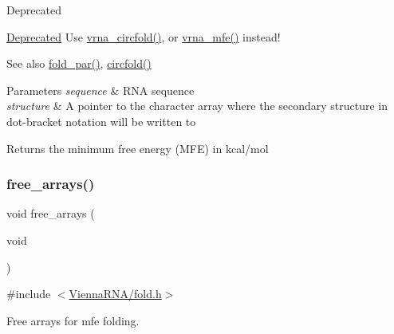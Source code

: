 \begin{DoxyRefDesc}{Deprecated}
\item[\hyperlink{deprecated__deprecated000072}{Deprecated}]Use \hyperlink{group__mfe__fold__single_gaf973483d8acbc8cc9aacfc8a9b7f0074}{vrna\+\_\+circfold()}, or \hyperlink{group__mfe__fold_gabd3b147371ccf25c577f88bbbaf159fd}{vrna\+\_\+mfe()} instead!\end{DoxyRefDesc}


\begin{DoxySeeAlso}{See also}
\hyperlink{group__mfe__fold__single_ga2bc41df5d71fee6fd8da9904ee65d8fb}{fold\+\_\+par()}, \hyperlink{group__mfe__fold__single_ga4ac63ab3e8d9a80ced28b8052d94e423}{circfold()}
\end{DoxySeeAlso}

\begin{DoxyParams}{Parameters}
{\em sequence} & R\+NA sequence \\
\hline
{\em structure} & A pointer to the character array where the secondary structure in dot-\/bracket notation will be written to \\
\hline
\end{DoxyParams}
\begin{DoxyReturn}{Returns}
the minimum free energy (M\+FE) in kcal/mol 
\end{DoxyReturn}
\mbox{\label{group__mfe__fold__single_ga107fdfe5fd641868156bfd849f6866c7}} 
\subsubsection{\texorpdfstring{free\+\_\+arrays()}{free\_arrays()}}
{\footnotesize\ttfamily void free\+\_\+arrays (\begin{DoxyParamCaption}\item[{void}]{ }\end{DoxyParamCaption})}



{\ttfamily \#include $<$\hyperlink{fold_8h}{Vienna\+R\+N\+A/fold.\+h}$>$}



Free arrays for mfe folding. 

